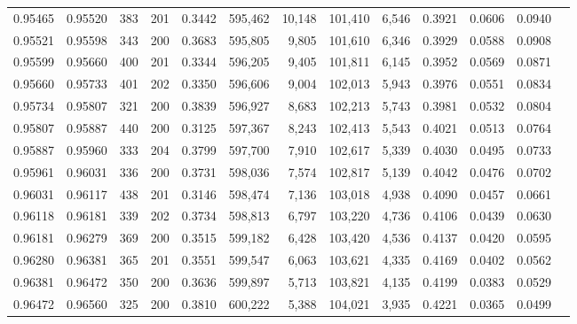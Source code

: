 \begin{tabular}{rrrrrrrrrrrrr}
0.95465 & 0.95520 &   383 & 201 &                                     0.3442 & 595,462 &  10,148 & 101,410 &   6,546 & 0.3921 & 0.0606 & 0.0940 \\
0.95521 & 0.95598 &   343 & 200 &                                     0.3683 & 595,805 &   9,805 & 101,610 &   6,346 & 0.3929 & 0.0588 & 0.0908 \\
0.95599 & 0.95660 &   400 & 201 &                                     0.3344 & 596,205 &   9,405 & 101,811 &   6,145 & 0.3952 & 0.0569 & 0.0871 \\
0.95660 & 0.95733 &   401 & 202 &                                     0.3350 & 596,606 &   9,004 & 102,013 &   5,943 & 0.3976 & 0.0551 & 0.0834 \\
0.95734 & 0.95807 &   321 & 200 &                                     0.3839 & 596,927 &   8,683 & 102,213 &   5,743 & 0.3981 & 0.0532 & 0.0804 \\
0.95807 & 0.95887 &   440 & 200 &                                     0.3125 & 597,367 &   8,243 & 102,413 &   5,543 & 0.4021 & 0.0513 & 0.0764 \\
0.95887 & 0.95960 &   333 & 204 &                                     0.3799 & 597,700 &   7,910 & 102,617 &   5,339 & 0.4030 & 0.0495 & 0.0733 \\
0.95961 & 0.96031 &   336 & 200 &                                     0.3731 & 598,036 &   7,574 & 102,817 &   5,139 & 0.4042 & 0.0476 & 0.0702 \\
0.96031 & 0.96117 &   438 & 201 &                                     0.3146 & 598,474 &   7,136 & 103,018 &   4,938 & 0.4090 & 0.0457 & 0.0661 \\
0.96118 & 0.96181 &   339 & 202 &                                     0.3734 & 598,813 &   6,797 & 103,220 &   4,736 & 0.4106 & 0.0439 & 0.0630 \\
0.96181 & 0.96279 &   369 & 200 &                                     0.3515 & 599,182 &   6,428 & 103,420 &   4,536 & 0.4137 & 0.0420 & 0.0595 \\
0.96280 & 0.96381 &   365 & 201 &                                     0.3551 & 599,547 &   6,063 & 103,621 &   4,335 & 0.4169 & 0.0402 & 0.0562 \\
0.96381 & 0.96472 &   350 & 200 &                                     0.3636 & 599,897 &   5,713 & 103,821 &   4,135 & 0.4199 & 0.0383 & 0.0529 \\
0.96472 & 0.96560 &   325 & 200 &                                     0.3810 & 600,222 &   5,388 & 104,021 &   3,935 & 0.4221 & 0.0365 & 0.0499 \\

\end{tabular}
